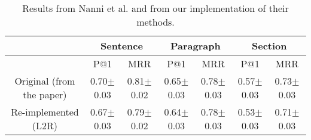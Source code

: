 \begin{table*}[t]
\caption{Results from Nanni et al.\cite{nanni2018entity} and from our implementation of their methods.}
\label{tab:Reproducible-results}
\begin{tabular}{ccccccc}
\toprule
                          & \multicolumn{2}{c}{Sentence} & \multicolumn{2}{c}{Paragraph} & \multicolumn{2}{c}{Section}  \\ \hline
                          & P@1           & MRR           & P@1            & MRR           & P@1           & MRR           \\
\midrule
Original (from the paper) & 0.70$\pm$0.03 & 0.81$\pm$0.02 & 0.65$\pm$0.03  & 0.78$\pm$0.03 & 0.57$\pm$0.03 & 0.73$\pm$0.03 \\ 
Re-implemented (L2R)      & 0.67$\pm$0.03 & 0.79$\pm$0.02 & 0.64$\pm$0.03  & 0.78$\pm$0.03 & 0.53$\pm$0.03 & 0.71$\pm$0.03 \\ 
\bottomrule
\end{tabular}
\end{table*}